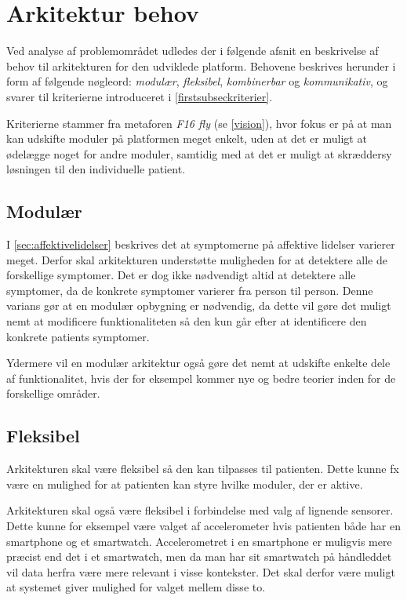 \section{Arkitektur behov}\label{arkitekturkrav}
Ved analyse af problemområdet udledes der i følgende afsnit en beskrivelse af behov til arkitekturen for den udviklede platform.
Behovene beskrives herunder i form af følgende nøgleord: \textit{modulær}, \textit{fleksibel}, \textit{kombinerbar} og \textit{kommunikativ}, og svarer til kriterierne introduceret i \cref{firstsubseckriterier}.

Kriterierne stammer fra metaforen \textit{F16 fly} (se \cref{vision}), hvor fokus er på at man kan udskifte moduler på platformen meget enkelt, uden at det er muligt at ødelægge noget for andre moduler, samtidig med at det er muligt at skræddersy løsningen til den individuelle patient.


\subsection{Modulær}\label{arkitekturkrav::modulaer}
I \cref{sec:affektivelidelser} beskrives det at symptomerne på affektive lidelser varierer meget.
Derfor skal arkitekturen understøtte muligheden for at detektere alle de forskellige symptomer.
Det er dog ikke nødvendigt altid at detektere alle symptomer, da de konkrete symptomer varierer fra person til person.
Denne varians gør at en modulær opbygning er nødvendig, da dette vil gøre det muligt nemt at modificere funktionaliteten så den kun går efter at identificere den konkrete patients symptomer.

Ydermere vil en modulær arkitektur også gøre det nemt at udskifte enkelte dele af funktionalitet, hvis der for eksempel kommer nye og bedre teorier inden for de forskellige områder.

\subsection{Fleksibel}\label{arkitekturkrav::fleksibel}
Arkitekturen skal være fleksibel så den kan tilpasses til patienten.
Dette kunne fx være en mulighed for at patienten kan styre hvilke moduler, der er aktive.

Arkitekturen skal også være fleksibel i forbindelse med valg af lignende sensorer.
Dette kunne for eksempel være valget af accelerometer hvis patienten både har en smartphone og et smartwatch.
Accelerometret i en smartphone er muligvis mere præcist end det i et smartwatch, men da man har sit smartwatch på håndleddet vil data herfra være mere relevant i visse kontekster.
Det skal derfor være muligt at systemet giver mulighed for valget mellem disse to.

